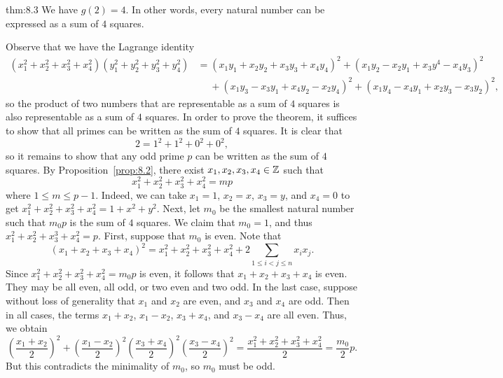 \begin{theo}{thm:8.3}
    We have $g(2) = 4$. In other words, every natural number can be 
    expressed as a sum of $4$ squares. 
\end{theo}
\begin{pf}
    Observe that we have the Lagrange identity 
    \begin{align*}
        (x_1^2 + x_2^2 + x_3^2 + x_4^2)(y_1^2 + y_2^2 + y_3^2 + y_4^2) 
        &= (x_1y_1 + x_2y_2 + x_3y_3 + x_4y_4)^2 + (x_1y_2 - x_2y_1 + x_3y^4 - x_4y_3)^2 \\
        &\quad\; + (x_1y_3 - x_3y_1 + x_4y_2 - x_2y_4)^2 + (x_1y_4 - x_4y_1 + x_2y_3 - x_3y_2)^2, 
    \end{align*}
    so the product of two numbers that are representable as a sum of $4$ 
    squares is also representable as a sum of $4$ squares. In order to 
    prove the theorem, it suffices to show that all primes can be written 
    as the sum of $4$ squares. It is clear that 
    \[ 2 = 1^2 + 1^2 + 0^2 + 0^2, \] 
    so it remains to show that any odd prime $p$ can be written as the sum of 
    $4$ squares. By Proposition~\ref{prop:8.2}, there exist $x_1, x_2, x_3, x_4 
    \in \mathbb{Z}$ such that 
    \[ x_1^2 + x_2^2 + x_3^2 + x_4^2 = mp \] 
    where $1 \leq m \leq p-1$. Indeed, we can take $x_1 = 1$, $x_2 = x$, 
    $x_3 = y$, and $x_4 = 0$ to get $x_1^2 + x_2^2 + x_3^2 + x_4^2 = 1 + x^2 + y^2$. 
    Next, let $m_0$ be the smallest natural number such that $m_0p$ is the 
    sum of $4$ squares. We claim that $m_0 = 1$, and thus 
    $x_1^2 + x_2^2 + x_3^3 + x_4^2 = p$. First, suppose that $m_0$ 
    is even. Note that 
    \[ (x_1 + x_2 + x_3 + x_4)^2 = x_1^2 + x_2^2 + x_3^2 + x_4^2 
    + 2 \sum_{1 \leq i < j \leq n} x_i x_j. \] 
    Since $x_1^2 + x_2^2 + x_3^2 + x_4^2 = m_0p$ is even, it follows that 
    $x_1 + x_2 + x_3 + x_4$ is even. They may be all even, all odd, 
    or two even and two odd. In the last case, suppose without loss 
    of generality that $x_1$ and $x_2$ are even, and $x_3$ and $x_4$ are odd. 
    Then in all cases, the terms $x_1 + x_2$, $x_1 - x_2$, $x_3 + x_4$, 
    and $x_3 - x_4$ are all even. Thus, we obtain 
    \[ \left( \frac{x_1 + x_2}{2} \right)^{\!2} + 
    \left( \frac{x_1 - x_2}{2} \right)^{\!2}
    \left( \frac{x_3 + x_4}{2} \right)^{\!2}
    \left( \frac{x_3 - x_4}{2} \right)^{\!2}
    = \frac{x_1^2 + x_2^2 + x_3^2 + x_4^2}{2} = \frac{m_0}{2} p. \] 
    But this contradicts the minimality of $m_0$, so $m_0$ must be odd. 


\end{pf}
